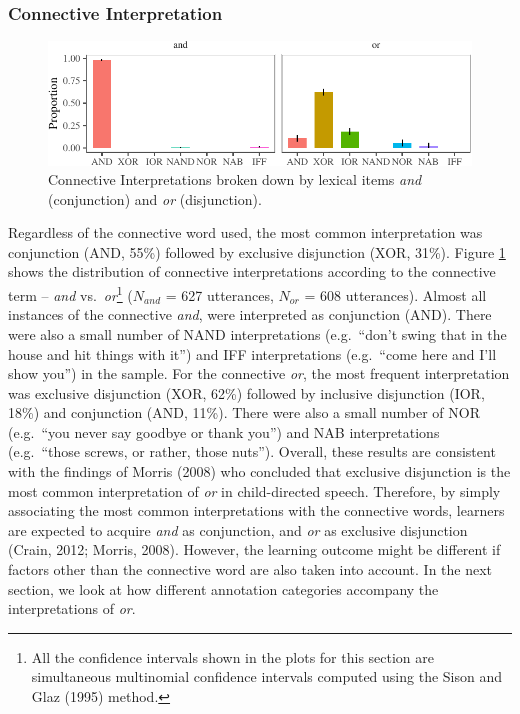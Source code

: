 \documentclass[
  ,man,floatsintext]{apa6}
\begin{document}
\hypertarget{connective-interpretation}{%
\subsubsection{Connective Interpretation}\label{connective-interpretation}}

\begin{figure}[H]

{\centering \includegraphics{figs/interpretationPlot-1} 

}

\caption{Connective Interpretations broken down by lexical items \textit{and} (conjunction) and \textit{or} (disjunction).}\label{fig:interpretationPlot}
\end{figure}

Regardless of the connective word used, the most common interpretation was conjunction (AND, 55\%) followed by exclusive disjunction (XOR, 31\%). Figure \ref{fig:interpretationPlot} shows the distribution of connective interpretations according to the connective term -- \emph{and} vs.~\emph{or}\footnote{All the confidence intervals shown in the plots for this section are simultaneous multinomial confidence intervals computed using the Sison and Glaz (1995) method.} (\(N_{and}\) = 627 utterances, \(N_{or}\) = 608 utterances). Almost all instances of the connective \emph{and}, were interpreted as conjunction (AND). There were also a small number of NAND interpretations (e.g.~``don't swing that in the house and hit things with it'') and IFF interpretations (e.g.~``come here and I'll show you'') in the sample. For the connective \emph{or}, the most frequent interpretation was exclusive disjunction (XOR, 62\%) followed by inclusive disjunction (IOR, 18\%) and conjunction (AND, 11\%). There were also a small number of NOR (e.g.~``you never say goodbye or thank you'') and NAB interpretations (e.g.~``those screws, or rather, those nuts''). Overall, these results are consistent with the findings of Morris (2008) who concluded that exclusive disjunction is the most common interpretation of \emph{or} in child-directed speech. Therefore, by simply associating the most common interpretations with the connective words, learners are expected to acquire \emph{and} as conjunction, and \emph{or} as exclusive disjunction (Crain, 2012; Morris, 2008). However, the learning outcome might be different if factors other than the connective word are also taken into account. In the next section, we look at how different annotation categories accompany the interpretations of \emph{or}.
\end{document}
